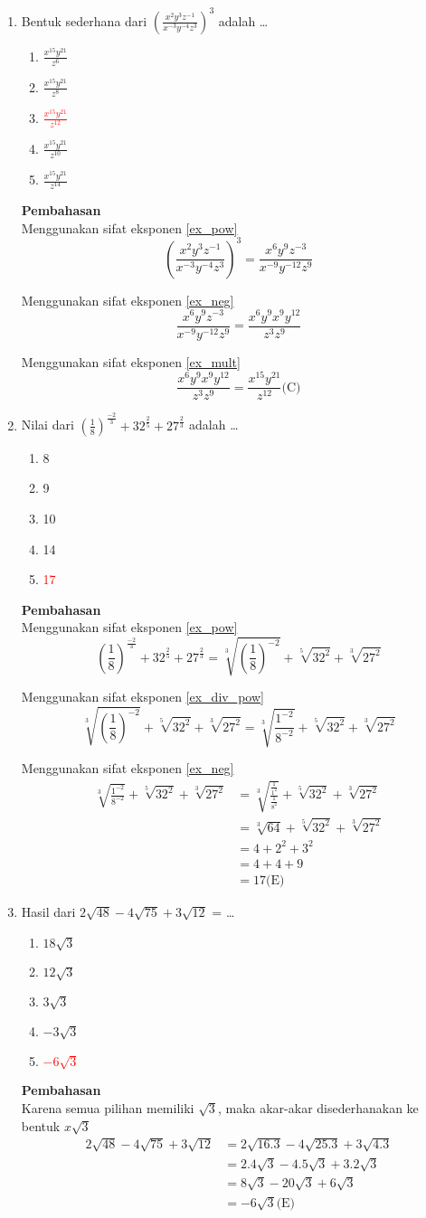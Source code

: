 \documentclass{report}
\newcommand{\options}[5]{
\begin{enumerate}[label=\alph*.]
	\item #1
	\item #2
	\item #3
	\item #4
	\item #5
\end{enumerate}
}
\newcommand{\pemb}{ \textbf{Pembahasan} \\}
\begin{document}
\begin{enumerate}
\item
Bentuk sederhana dari $\left(\frac{x^{2}y^{3}z^{-1}}{x^{-3}y^{-4}z^{3}}\right)^3$ adalah \ldots
\options
{$\frac{x^{15} y^{21}}{z^6}$}
{$\frac{x^{15} y^{21}}{z^8}$}
{\textcolor{red}{{$\frac{x^{15} y^{21}}{z^{12}}$}}}
{$\frac{x^{15} y^{21}}{z^{10}}$}
{$\frac{x^{15} y^{21}}{z^{14}}$}

\pemb

Menggunakan sifat eksponen \ref{ex_pow}
\[
	\left(\frac{x^{2}y^{3}z^{-1}}{x^{-3}y^{-4}z^{3}}\right)^3 = \frac{x^{6}y^{9}z^{-3}}{x^{-9}y^{-12}z^{9}}
\]

Menggunakan sifat eksponen \ref{ex_neg}
\[
	\frac{x^{6}y^{9}z^{-3}}{x^{-9}y^{-12}z^{9}} =
	\frac{x^{6}y^{9}x^{9}y^{12}}{z^{3}z^{9}}
\]

Menggunakan sifat eksponen \ref{ex_mult}
\[
	\frac{x^{6}y^{9}x^{9}y^{12}}{z^{3}z^{9}} = 
	\frac{x^{15} y^{21}}{z^{12}} \text{(C)}
\]


\item
Nilai dari $\left(\frac{1}{8}\right)^{\frac{-2}{3}}+32^{\frac{2}{5}}+27^{\frac{2}{3}}$ adalah \ldots
\options
{8}
{9}
{10}
{14}
{\textcolor{red}{17}}

\pemb

Menggunakan sifat eksponen \ref{ex_pow}
\[
	\left(\frac{1}{8}\right)^{\frac{-2}{3}}+32^{\frac{2}{5}}+27^{\frac{2}{3}} = 
	\sqrt[3]{\left(\frac{1}{8}\right)^{-2}}+\sqrt[5]{32^{2}}+\sqrt[3]{27^{2}}
\]

Menggunakan sifat eksponen \ref{ex_div_pow}
\[
	\sqrt[3]{\left(\frac{1}{8}\right)^{-2}}+\sqrt[5]{32^{2}}+\sqrt[3]{27^{2}} =
	\sqrt[3]{\frac{1^{-2}}{8^{-2}}}+\sqrt[5]{32^{2}}+\sqrt[3]{27^{2}}	
\]

Menggunakan sifat eksponen \ref{ex_neg} \\
\begin{align*}
								\sqrt[3]{\frac{1^{-2}}{8^{-2}}}+\sqrt[5]{32^{2}}+\sqrt[3]{27^{2}} 
								&= \sqrt[3]{\frac{\frac{1}{1^{2}}}{\frac{1}{8^{2}}}}+\sqrt[5]{32^{2}}+\sqrt[3]{27^{2}}\\
								&= \sqrt[3]{64}+\sqrt[5]{32^{2}}+\sqrt[3]{27^{2}}\\
								&= 4 + 2^2 + 3^2 \\
								&= 4 + 4 + 9 \\
								&= 17  \text{(E)}
\end{align*}

\item
Hasil dari $2\sqrt{48}-4\sqrt{75}+3\sqrt{12}$ = \ldots
\options
{$18\sqrt{3}$}
{$12\sqrt{3}$}
{$3\sqrt{3}$}
{$-3\sqrt{3}$}
{\textcolor{red}{$-6\sqrt{3}$}}
\pemb
Karena semua pilihan memiliki $\sqrt{3}$, maka akar-akar disederhanakan ke bentuk $x\sqrt{3}$
\begin{align*}
	2\sqrt{48}-4\sqrt{75}+3\sqrt{12} 
	&= 2\sqrt{16.3}-4\sqrt{25.3}+3\sqrt{4.3} \\
	&= 2.4\sqrt{3}-4.5\sqrt{3}+3.2\sqrt{3} \\
	&= 8\sqrt{3}-20\sqrt{3}+6\sqrt{3} \\
	&= -6\sqrt{3} \text{(E)}
\end{align*}


\end{enumerate}
\end{document}
